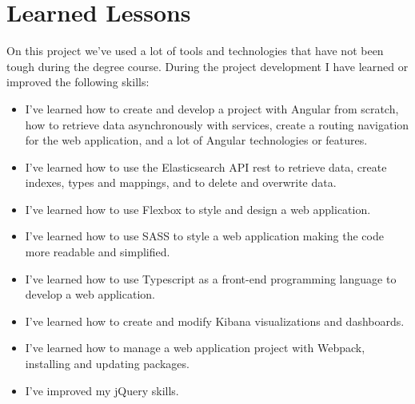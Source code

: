 \documentclass[a4paper, 12pt, english]{book}
\begin{document}



\section{Learned Lessons}
\label{sec:learned-lessons}

On this project we've used a lot of tools and technologies that have not been tough during the degree course. During the project development I have learned or improved the following skills:
\begin{itemize}
    \item I've learned how to create and develop a project with Angular from scratch, how to retrieve data asynchronously with services, create a routing navigation for the web application, and a lot of Angular technologies or features.
    \item I've learned how to use the Elasticsearch API rest to retrieve data, create indexes, types and mappings, and to delete and overwrite data.
    \item I've learned how to use Flexbox to style and design a web application.
    \item I've learned how to use SASS to style a web application making the code more readable and simplified.
    \item I've learned how to use Typescript as a front-end programming language to develop a web application.
    \item I've learned how to create and modify Kibana visualizations and dashboards.
    \item I've learned how to manage a web application project with Webpack, installing and updating packages.
    \item I've improved my jQuery skills.
\end{itemize}


\end{document}
